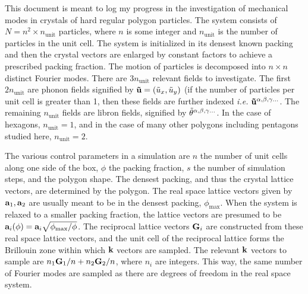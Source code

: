 \documentclass[12pt]{article}
\begin{document}
This document is meant to log my progress in the investigation of mechanical 
modes in crystals of hard regular polygon particles. The system consists of $N 
= n^2\times n_{\mathrm{unit}}$ particles, where $n$ is some integer and 
$n_\mathrm{unit}$ is the number of particles in the unit cell. The system is 
initialized in its densest known packing and then the crystal vectors are 
enlarged by constant factors to achieve a prescribed packing fraction. The 
motion of particles is decomposed into $n\times n$ distinct Fourier modes. 
There are $3n_\mathrm{unit}$ relevant fields to investigate. The first 
$2n_\mathrm{unit}$ are phonon fields signified by $\mathbf{\tilde u} = 
\left(\tilde u_x, \tilde u_y\right)$ (if the number of particles per unit cell is 
greater than 1, then these fields are further indexed \emph{i.e.\!} $\mathbf{\tilde 
u}^{\alpha,\beta,\gamma\ldots}$. The remaining $n_\mathrm{unit}$ fields are libron fields, 
signified by $\tilde {\theta}^{\alpha,\beta,\gamma\ldots}$. In the case of hexagons, 
$n_\mathrm{unit} = 1$, and in the case of many other polygons including 
pentagons studied here, $n_\mathrm{unit} = 2$.

The various control parameters in a simulation are $n$ the number of unit 
cells along one side of the box, $\phi$ the packing fraction, $s$ the number of 
simulation steps, and the polygon shape. The densest packing, and thus the 
crystal lattice vectors, are determined by the polygon. The real space lattice 
vectors given by $\mathbf{a}_1, \mathbf{a}_2$ are usually meant to be in the densest 
packing, $\phi_\mathrm{max}$. When the system is relaxed to a smaller packing 
fraction, the lattice vectors are presumed to be $\mathbf{a}_i(\phi) = \mathbf{a}_i 
\sqrt{\phi_\mathrm{max}/\phi}$. The reciprocal lattice vectors $\mathbf{G}_i$ are 
constructed from these real space lattice vectors, and the unit cell of the 
reciprocal lattice forms the Brillouin zone within which $\mathbf{k}$ vectors are 
sampled. The relevant $\mathbf{k}$ vectors to sample are $n_1 \mathbf{G}_1/n + n_2 \mathbf{G}_2/n$, where $n_i$ are integers. This way, the same number of Fourier modes 
are sampled as there are degrees of freedom in the real space system.
\end{document}
